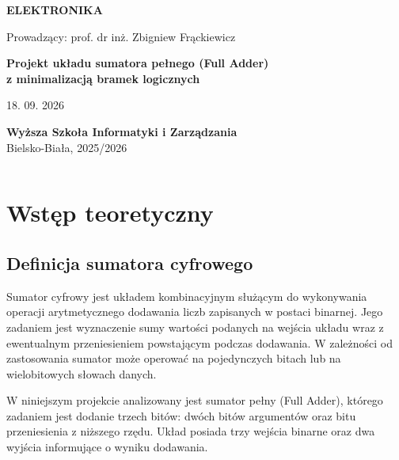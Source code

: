 \documentclass[12pt,a4paper]{article}
\begin{document}
\begin{titlepage}
    \centering
    {\Large \textbf{ELEKTRONIKA}\par}
    \vspace{1em}
    {\large Prowadzący: prof. dr inż. Zbigniew Frąckiewicz\par}
    \vspace{4em}
    {\LARGE \textbf{Projekt układu sumatora pełnego (Full Adder)\\[0.5em] z minimalizacją bramek logicznych}\par}
    \vspace{4em}
    {\large 18. 09. 2026\par}
    \vfill
    {\large \textbf{Wyższa Szkoła Informatyki i Zarządzania}\\[0.3em]
    Bielsko-Biała, 2025/2026\par}
    \vspace{2em}
    \begin{tabular}{|c|}
        \hline
        [IMIĘ NAZWISKO NUMER INDEKSU] \\
        \hline
    \end{tabular}
\end{titlepage}

\tableofcontents
\newpage


\section{Wstęp teoretyczny}

\subsection{Definicja sumatora cyfrowego}

Sumator cyfrowy jest układem kombinacyjnym służącym do wykonywania operacji arytmetycznego dodawania liczb zapisanych w postaci binarnej. Jego zadaniem jest wyznaczenie sumy wartości podanych na wejścia układu wraz z ewentualnym przeniesieniem powstającym podczas dodawania. W zależności od zastosowania sumator może operować na pojedynczych bitach lub na wielobitowych słowach danych.

W niniejszym projekcie analizowany jest sumator pełny (Full Adder), którego zadaniem jest dodanie trzech bitów: dwóch bitów argumentów oraz bitu przeniesienia z niższego rzędu. Układ posiada trzy wejścia binarne oraz dwa wyjścia informujące o wyniku dodawania.
\end{document}
